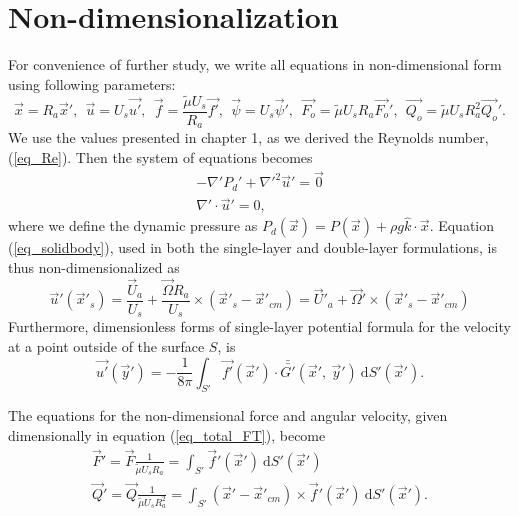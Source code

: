 \section{Non-dimensionalization}
\label{section3}
For convenience of further study, we write all equations in non-dimensional form using following parameters:
\begin{equation}
\vec{x} = R_a\vec{x}', 
\ \
 \vec{u} = U_s \vec{u'},
 \ \ 
  \vec{f} = \frac{\tilde{\mu} U_s}{R_a} \vec{f'},
  \ \ 
  \vec{\psi} = U_s \vec{\psi}',
  \ \ 
  \vec{F_o} = \tilde{\mu} U_s R_a \vec{F_o}',
  \ \
  \vec{Q_o} = \tilde{\mu} U_s R_a^2 \vec{Q_o}'.
\label{eq_nonD}
\end{equation}
We use the values presented in chapter 1, as we derived the Reynolds number, (\ref{eq_Re}). 
Then the system of equations becomes
\begin{align}
    -\nabla' P_d' +  \nabla'^2 \vec{u}'  = \vec{0}
	\label{eq_momentum_noD}
	\\
    \nabla' \cdot \vec{u}' = 0,
	\label{eq_conti_noD}
\end{align}
where we define the dynamic pressure as 
$P_d(\vec{x}) =  P(\vec{x}) + \rho g \hat{k} \cdot \vec{x}$.
Equation (\ref{eq_solidbody}), used in both the single-layer and double-layer formulations, is thus non-dimensionalized as 
\begin{equation}
  \vec{u}'(\vec{x}'_s) = \frac{\vec{U}_a}{U_s} +  \frac{\vec{\Omega}R_a}{U_s} \times (\vec{x}'_s - \vec{x}'_{cm}) = \vec{U}'_a +  \vec{\Omega}' \times (\vec{x}'_s - \vec{x}'_{cm})
  \label{eq_solidbody_nonD}
\end{equation}
Furthermore, dimensionless forms of single-layer potential formula for the velocity at a point outside of the surface $S$, is 
\begin{equation}
    \vec{u'}(\vec{y}') =
	- \frac{1}{8 \pi}
	\int_{S'}  \vec{f'}(\vec{x}') \cdot \bar{\bar{G'}}(\vec{x}', \ \vec{y}') \ \text{d}S'(\vec{x}').
    \label{eq_BI_sl_ND}
\end{equation}
\par
The equations for the non-dimensional force and angular velocity, given dimensionally in equation (\ref{eq_total_FT}), become
\begin{align}
\vec{F}' =  \vec{F} \frac{1}{\tilde{\mu} U_s R_a}  =  \int_{S'} \vec{f}'(\vec{x}') \  \text{d}S'(\vec{x}')  
\label{eq_forcebal} 
\\  
 \vec{Q}' = \vec{Q} \frac{1}{\tilde{\mu} U_s R_a^2} =  \int_{S'} (\vec{x}' - \vec{x}'_{cm}) \times \vec{f}'(\vec{x}')  \ \text{d}S'(\vec{x}').  \label{eq_torquebal} 
\end{align}
